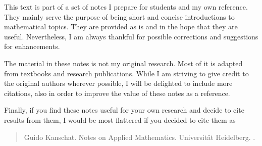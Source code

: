 
This text is part of a set of notes I prepare for students and my own
reference. They mainly serve the purpose of being short and concise
introductions to mathematical topics. They are provided as is and in
the hope that they are useful. Nevertheless, I am always thankful for
possible corrections and suggestions for enhancements.

The material in these notes is not my original research. Most of it is
adapted from textbooks and research publications. While I am striving
to give credit to the original authors wherever possible, I will be
delighted to include more citations, also in order to improve the
value of these notes as a reference.

Finally, if you find these notes useful for your own research and
decide to cite results from them, I would be most flattered if you
decided to cite them as
\begin{verse}
  Guido Kanschat. Notes on Applied Mathematics. Universität
  Heidelberg. \svnyear.
\end{verse}

